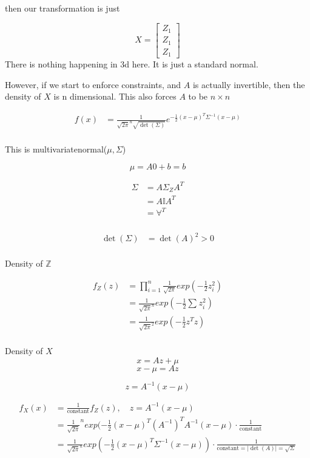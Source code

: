 \documentclass{report}
\begin{document}
then our transformation is just 

\[
X = \begin{bmatrix}
	Z_1\\
	Z_1\\
	Z_1
\end{bmatrix}
\]
There is nothing happening in 3d here. It is just a standard normal. 

However, if we start to enforce constraints, 
and $A$  is actually invertible, then the density of $X$  is n dimensional. This also forces $A$  to be $n \times n$ 


\begin{align*}
	f(x) &= \frac{1}{\sqrt{2\pi}^{n} \sqrt{\det(\Sigma)}} e^{-\frac{1}{2} (x - \mu)^{T} \Sigma^{-1} (x-\mu )} \\
\end{align*}

This is multivariatenormal($\mu , \Sigma$)


\[
\mu = A 0 + b = b
\]

\begin{align*}
	\Sigma &= A \Sigma_{Z} A^{T}\\
	       &= A \mathbb{I} A^{T} \\
	       &= \forall ^{T} \\
\end{align*}


\begin{align*}
	\det(\Sigma) &= \det(A)^{2} > 0 \\
\end{align*}


Density of $\mathbb{Z}$

\begin{align*}
	f_{Z} (z) &= \prod_{i=1}^{n}  \frac{1}{\sqrt{2\pi}} exp(-\frac{1}{2} z_{i}^{2})\\
		  &=\frac{1}{\sqrt{2\pi}^{n}} exp(-\frac{1}{2} \sum_{}^{} z_{i}^{2})  \\
		  &= \frac{1}{\sqrt{2\pi}^{2}} exp(-\frac{1}{2} z^{T}z) \\
\end{align*}


Density of $X$ 
\[
x = Az + \mu 
\]
\[
x - \mu = Az
\]

\[
z = A^{-1} (x - \mu )
\]

\begin{align*}
	f_{X}(x) &= \frac{1}{\text{constant}}f_{Z}(z) , \quad z = A^{-1} (x-\mu )  \\
		 &= \frac{1}{\sqrt{2\pi}}^{n} exp(-\frac{1}{2} (x-\mu )^{T}(A^{-1})^{T} A^{-1} (x-\mu ) \cdot \frac{1}{\text{constant}} \\
		 &= \frac{1}{\sqrt{2\pi}^{n}} exp(-\frac{1}{2} (x-\mu )^{T} \Sigma^{-1} (x-\mu )) \cdot  \frac{1}{\text{constant} = \vert \det(A)\vert = \sqrt{\Sigma }}\\ 
\end{align*}
\end{document}
